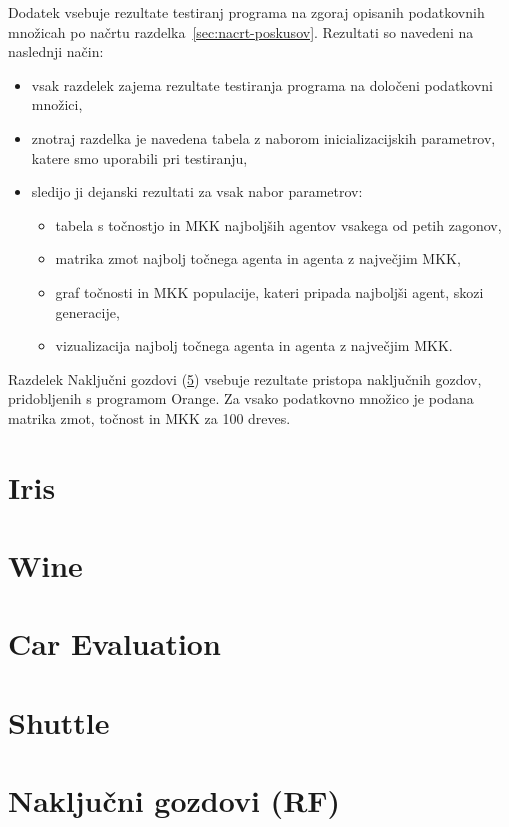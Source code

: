 Dodatek vsebuje rezultate testiranj programa na zgoraj opisanih podatkovnih množicah po načrtu razdelka~\ref{sec:nacrt-poskusov}.
Rezultati so navedeni na naslednji način:
\begin{itemize}
    \item vsak razdelek zajema rezultate testiranja programa na določeni podatkovni množici,
    \item znotraj razdelka je navedena tabela z naborom inicializacijskih parametrov, katere smo uporabili pri testiranju,
    \item sledijo ji dejanski rezultati za vsak nabor parametrov:
    \begin{itemize}
        \item tabela s točnostjo in MKK najboljših agentov vsakega od petih zagonov,
        \item matrika zmot najbolj točnega agenta in agenta z največjim MKK,
        \item graf točnosti in MKK populacije, kateri pripada najboljši agent, skozi generacije,
        \item vizualizacija najbolj točnega agenta in agenta z največjim MKK.
    \end{itemize}
\end{itemize}

Razdelek Naključni gozdovi (\ref{sec:random-forest-test}) vsebuje rezultate pristopa naključnih gozdov, pridobljenih s programom Orange.
Za vsako podatkovno množico je podana matrika zmot, točnost in MKK za 100 dreves.

\section{Iris}\label{sec:dodatek-iris-test}


\section{Wine}\label{sec:dodatek-wine-test}


\section{Car Evaluation}\label{sec:dodatek-car-test}


\newpage
\section{Shuttle}\label{sec:dodatek-statlog-test}


\newpage
\section{Naključni gozdovi (RF)}\label{sec:random-forest-test}


